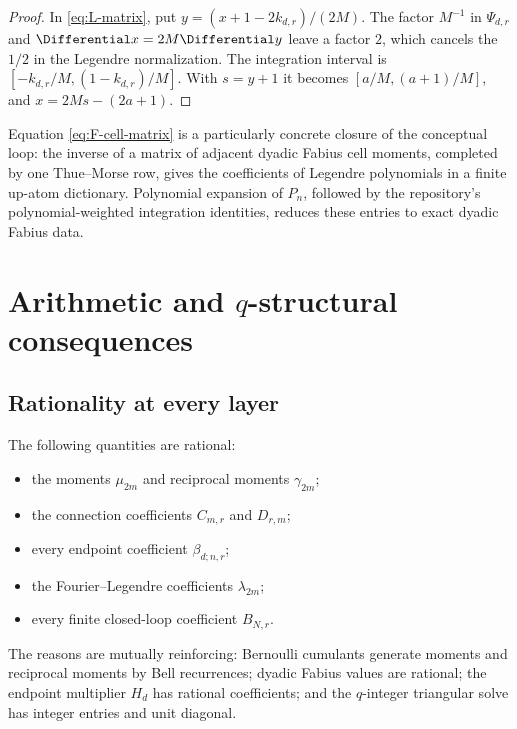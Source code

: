 \documentclass[11pt,oneside]{article}
\theoremstyle{definition}
\theoremstyle{remark}
\begin{document}
\begin{proof}
In \eqref{eq:L-matrix}, put
$y=(x+1-2k_{d,r})/(2M)$.  The factor $M^{-1}$ in $\Psi_{d,r}$ and
$\Differential x=2M\Differential y$ leave a factor $2$, which cancels the $1/2$ in the Legendre
normalization.  The integration interval is
$[-k_{d,r}/M,(1-k_{d,r})/M]$.  With $s=y+1$ it becomes
$[a/M,(a+1)/M]$, and
$x=2Ms-(2a+1)$.
\end{proof}

Equation \eqref{eq:F-cell-matrix} is a particularly concrete closure of the
conceptual loop: the inverse of a matrix of adjacent dyadic Fabius cell
moments, completed by one Thue--Morse row, gives the coefficients of Legendre
polynomials in a finite up-atom dictionary.  Polynomial expansion of $P_n$,
followed by the repository's polynomial-weighted integration identities,
reduces these entries to exact dyadic Fabius data.

\section{Arithmetic and $q$-structural consequences}
\label{sec:arithmetic}

\subsection{Rationality at every layer}
The following quantities are rational:
\begin{itemize}
\item the moments $\mu_{2m}$ and reciprocal moments $\gamma_{2m}$;
\item the connection coefficients $C_{m,r}$ and $D_{r,m}$;
\item every endpoint coefficient $\beta_{d;n,r}$;
\item the Fourier--Legendre coefficients $\lambda_{2m}$;
\item every finite closed-loop coefficient $B_{N,r}$.
\end{itemize}
The reasons are mutually reinforcing: Bernoulli cumulants generate moments
and reciprocal moments by Bell recurrences; dyadic Fabius values are rational;
the endpoint multiplier $H_d$ has rational coefficients; and the
$q$-integer triangular solve has integer entries and unit diagonal.
\end{document}
